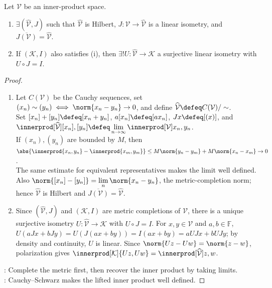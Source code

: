 \begin{theorem} \label{thm:hilbert-completion-inner-product-space} \\
Let $\mathcal{V}$ be an inner-product space.
\begin{enumerate}[label=(\roman*)]
\setlength{\itemsep}{0pt}
\item $\exists(\widehat{\mathcal{V}},J)$ such that $\widehat{\mathcal{V}}$ is Hilbert, $J:\mathcal{V}\to\widehat{\mathcal{V}}$ is a linear isometry, and $\overline{J(\mathcal{V})}=\widehat{\mathcal{V}}$.
\item If $(\mathcal{K},I)$ also satisfies (i), then $\exists!U:\widehat{\mathcal{V}}\to\mathcal{K}$ a surjective linear isometry with $U\circ J=I$.
\end{enumerate}
\begin{proof}
\begin{enumerate}[label=(\roman*)]
\setlength{\itemsep}{0pt}
\item Let $C(\mathcal{V})$ be the Cauchy sequences, set $(x_n)\sim(y_n)\iff\norm{x_n-y_n}\to0$, and define $\widehat{\mathcal{V}}\defeq C(\mathcal{V})/\sim$.\\
Set $[x_n]+[y_n]\defeq[x_n+y_n]$, $a[x_n]\defeq[ax_n]$, $Jx\defeq[(x)]$, and $\innerprod[\widehat{\mathcal{V}}]{[x_n],[y_n]}\defeq\lim\limits_{n\to\infty}\innerprod[\mathcal{V}]{x_n,y_n}$.\\
If $(x_n),(y_n)$ are bounded by $M$, then $\abs{\innerprod{x_n,y_n}-\innerprod{x_m,y_m}}\leq M\norm{y_n-y_m}+M\norm{x_n-x_m}\to0$.\\
The same estimate for equivalent representatives makes the limit well defined.\\
Also $\norm{[x_n]-[y_n]}=\lim\limits_n\norm{x_n-y_n}$, the metric-completion norm; hence $\widehat{\mathcal{V}}$ is Hilbert and $\overline{J(\mathcal{V})}=\widehat{\mathcal{V}}$.
\item Since $(\widehat{\mathcal V},J)$ and $(\mathcal K,I)$ are metric completions of $\mathcal V$, there is a unique surjective isometry $U:\widehat{\mathcal V}\to\mathcal K$ with $U\circ J=I$. For $x,y\in\mathcal V$ and $a,b\in\mathbb F$, $U(aJx+bJy)=U(J(ax+by))=I(ax+by)=aUJx+bUJy$; by density and continuity, $U$ is linear. Since $\norm{Uz-Uw}=\norm{z-w}$, polarization gives $\innerprod[\mathcal K]{Uz,Uw}=\innerprod[\widehat{\mathcal V}]{z,w}$.
\end{enumerate}
: Complete the metric first, then recover the inner product by taking limits.\\
: Cauchy--Schwarz makes the lifted inner product well defined.
\end{proof}
\end{theorem}

